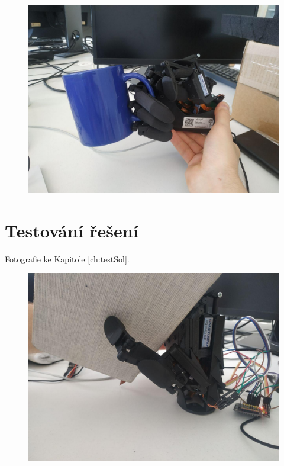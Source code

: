 \documentclass[thesis=B,czech]{FITthesis}[2012/06/26]
\begin{document}
 \begin{figure}[H]
\centering
\includegraphics[scale=0.3]{./image/testF4.jpg}
\end{figure} 

\section{Testování řešení}

Fotografie ke Kapitole \ref{ch:testSol}.



 \begin{figure}[H]
\centering
\includegraphics[scale=0.3]{./image/testSolF1.jpg}
\end{figure} 
\end{document}
